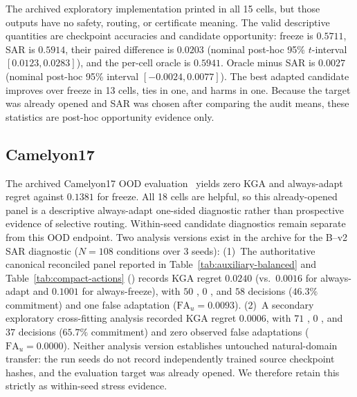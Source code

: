 The archived exploratory implementation printed \abstain in all 15 cells, but those outputs
have no safety, routing, or certificate meaning. The valid descriptive quantities are checkpoint
accuracies and candidate opportunity: freeze is $0.5711$, SAR is $0.5914$, their paired difference
is $0.0203$ (nominal post-hoc 95\% $t$-interval $[0.0123,0.0283]$), and the per-cell oracle is
$0.5941$. Oracle minus SAR is $0.0027$ (nominal post-hoc 95\% interval $[-0.0024,0.0077]$).
The best adapted candidate improves over freeze
in 13 cells, ties in one, and harms in one. Because the target was already opened and SAR was chosen
after comparing the audit means, these statistics are post-hoc opportunity evidence only.

\subsection{Camelyon17}
\label{app:camelyon17}

The archived Camelyon17 OOD evaluation~\cite{bandi2019camelyon} yields zero KGA and always-adapt regret against $0.1381$ for
freeze. All 18 cells are helpful, so this already-opened panel is a descriptive always-adapt
one-sided diagnostic rather than prospective evidence of selective routing. Within-seed candidate diagnostics remain separate from this OOD endpoint. Two analysis versions exist in the archive for the B--v2 SAR diagnostic ($N=108$ conditions over 3 seeds): (1)~The authoritative canonical reconciled panel reported in Table~\ref{tab:auxiliary-balanced} and Table~\ref{tab:compact-actions} () records KGA regret $0.0240$ (vs.\ $0.0016$ for always-adapt and $0.1001$ for always-freeze), with $50$ \adapt, $0$ \freeze, and $58$ \abstain decisions ($46.3\%$ commitment) and one false adaptation ($\mathrm{FA}_u = 0.0093$). (2)~A secondary exploratory cross-fitting analysis recorded KGA regret $0.0006$, with $71$ \adapt, $0$ \freeze, and $37$ \abstain decisions ($65.7\%$ commitment) and zero observed false adaptations ($\mathrm{FA}_u = 0.0000$). Neither analysis version establishes untouched natural-domain transfer: the run seeds do not record independently trained source checkpoint hashes, and the evaluation target was already opened. We therefore retain this strictly as within-seed stress evidence.

